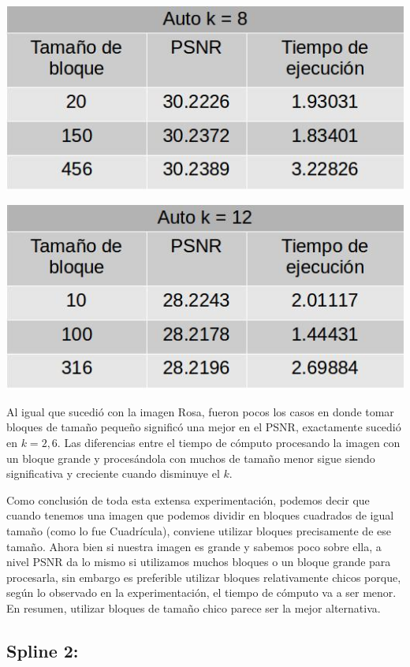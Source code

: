 \documentclass[a4paper]{article}
\begin{document}
\centerline{
\includegraphics[scale=0.5]{imagenes/autok8Tabla.jpg}
}
\vspace{1cm}

\centerline{
\includegraphics[scale=0.5]{imagenes/autok12Tabla.jpg}
}

Al igual que sucedió con la imagen Rosa, fueron pocos los casos en donde tomar bloques de tamaño pequeño significó una mejor en el PSNR, exactamente sucedió en $k = 2, 6$. Las diferencias entre el tiempo de cómputo procesando la imagen con un bloque grande y procesándola con muchos de tamaño menor sigue siendo significativa y creciente cuando disminuye el $k$.
\par Como conclusión de toda esta extensa experimentación, podemos decir que cuando tenemos una imagen que podemos dividir en bloques cuadrados de igual tamaño (como lo fue Cuadrícula), conviene utilizar bloques precisamente de ese tamaño. Ahora bien si nuestra imagen es grande y sabemos poco sobre ella, a nivel PSNR da lo mismo si utilizamos muchos bloques o un bloque grande para procesarla, sin embargo es preferible utilizar bloques relativamente chicos porque, según lo observado en la experimentación, el tiempo de cómputo va a ser menor. En resumen, utilizar bloques de tamaño chico parece ser la mejor alternativa.


\subsection{Spline 2:}
\end{document}
